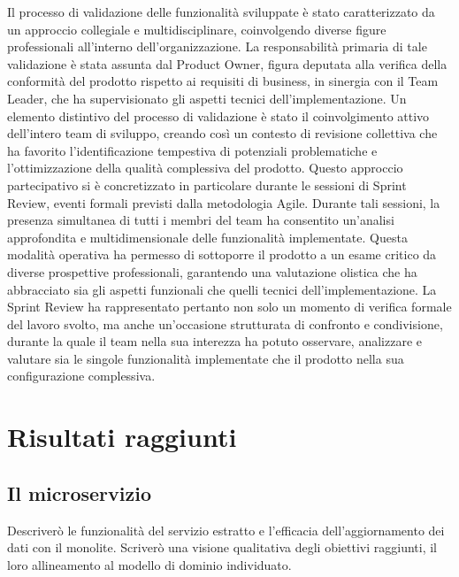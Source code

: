 Il processo di validazione delle funzionalità sviluppate è stato caratterizzato da un approccio collegiale e multidisciplinare, coinvolgendo diverse figure professionali all'interno dell'organizzazione. La responsabilità primaria di tale validazione è stata assunta dal Product Owner, figura deputata alla verifica della conformità del prodotto rispetto ai requisiti di business, in sinergia con il Team Leader, che ha supervisionato gli aspetti tecnici dell'implementazione.
Un elemento distintivo del processo di validazione è stato il coinvolgimento attivo dell'intero team di sviluppo, creando così un contesto di revisione collettiva che ha favorito l'identificazione tempestiva di potenziali problematiche e l'ottimizzazione della qualità complessiva del prodotto. Questo approccio partecipativo si è concretizzato in particolare durante le sessioni di Sprint Review, eventi formali previsti dalla metodologia Agile.
Durante tali sessioni, la presenza simultanea di tutti i membri del team ha consentito un'analisi approfondita e multidimensionale delle funzionalità implementate. Questa modalità operativa ha permesso di sottoporre il prodotto a un esame critico da diverse prospettive professionali, garantendo una valutazione olistica che ha abbracciato sia gli aspetti funzionali che quelli tecnici dell'implementazione.
La Sprint Review ha rappresentato pertanto non solo un momento di verifica formale del lavoro svolto, ma anche un'occasione strutturata di confronto e condivisione, durante la quale il team nella sua interezza ha potuto osservare, analizzare e valutare sia le singole funzionalità implementate che il prodotto nella sua configurazione complessiva.


    \section{Risultati raggiunti}
        \subsection{Il microservizio}
        Descriverò le funzionalità del servizio estratto e l'efficacia dell'aggiornamento dei dati con il monolite.
        Scriverò una visione qualitativa degli obiettivi raggiunti, il loro allineamento al modello di dominio individuato.

